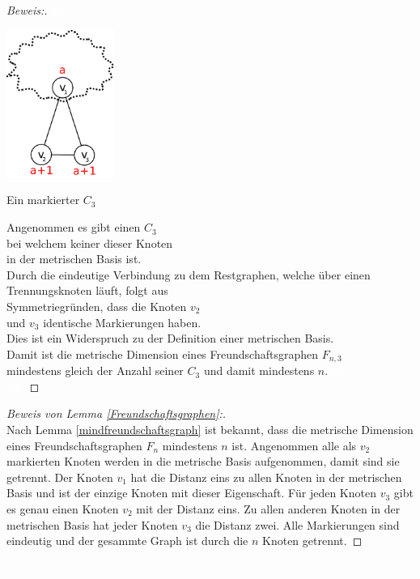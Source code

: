 \begin{proof}[Beweis:]
\textcolor{white}{lala}
\begin{floatingfigure}[l]{230pt}
\centering
\includegraphics*[width = 100pt]{bilder/freundschaftsgraphbew.pdf}
\caption{Ein markierter $C_{3}$}
\end{floatingfigure}
Angenommen es gibt einen $C_3$\\bei welchem keiner dieser Knoten\\in der metrischen Basis ist.\\Durch die eindeutige Verbindung zu dem Restgraphen, welche über  einen\\Trennungsknoten läuft, folgt aus\\Symmetriegründen, dass die Knoten $v_{2}$\\und $v_{3}$ identische Markierungen haben.\\Dies ist ein Widerspruch zu der Definition einer metrischen Basis.\\
Damit ist die metrische Dimension eines Freundschaftsgraphen $F_{n,3}$\\mindestens gleich der Anzahl seiner $C_{3}$ und damit mindestens $n$.\textcolor{white}{lala}\\\textcolor{white}{lala}
\end{proof}
\vspace{-6mm}
\begin{proof}[Beweis von Lemma \ref{Freundschaftsgraphen}:] \vspace{+1mm}
\textcolor{white}{lala}\\ 
Nach Lemma \ref{mindfreundschaftsgraph} ist bekannt, dass die metrische Dimension eines Freundschaftsgraphen $F_n$ mindestens $n$ ist. Angenommen alle als $v_2$ markierten Knoten werden in die metrische Basis aufgenommen, damit sind sie getrennt. Der Knoten $v_1$ hat die Distanz eins zu allen Knoten in der metrischen Basis und ist der einzige Knoten mit dieser Eigenschaft. Für jeden Knoten $v_3$ gibt es genau einen Knoten $v_2$ mit der Distanz eins. Zu allen anderen Knoten in der metrischen Basis hat jeder Knoten $v_3$ die Distanz zwei. Alle Markierungen sind eindeutig und der gesammte Graph ist durch die $n$ Knoten getrennt.
\end{proof}
\vspace{-10mm}
\textcolor{white}{x}\\

